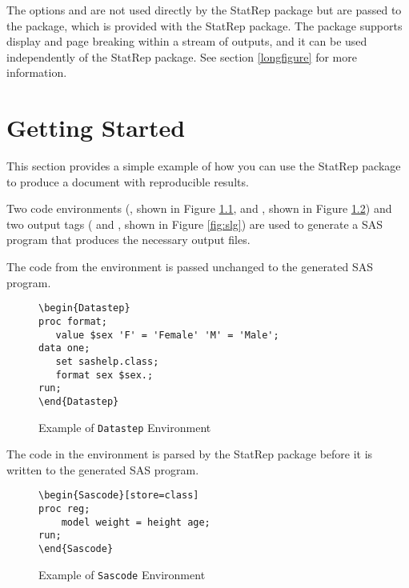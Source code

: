 \documentclass[article,oneside]{memoir}
\newcommand*{\StatRep}{\textsf{StatRep}\xspace}
\begin{document}
     The options  and  are not used directly by the \StatRep
     package but are passed to the  package, which
     is provided with the \StatRep package.
    The  package
    supports display and page breaking within a stream of outputs, and it can be
    used independently of the \StatRep package. See section \ref{longfigure} for
more information.

\chapter{Getting Started}\label{gs}

This section provides a simple example of how you can use the \StatRep package
to produce a document with reproducible results.

  Two code environments
  (, shown in Figure \ref{fig:d1}, and
  , shown in Figure \ref{fig:s1})
  and two output tags
  ( and , shown in Figure \ref{fig:slg})
  are used to generate a SAS program that produces
  the necessary output files.

  The code from the  environment is passed unchanged to the
  generated SAS program.
\begin{figure}[H]
\begin{snugshade}
\begin{verbatim}
\begin{Datastep}
proc format;
   value $sex 'F' = 'Female' 'M' = 'Male';
data one;
   set sashelp.class;
   format sex $sex.;
run;
\end{Datastep}
\end{verbatim}
\end{snugshade}
\caption{Example of \texttt{Datastep} Environment}\label{fig:d1}
\end{figure}

  The code in the  environment is parsed by the \StatRep package before it is
  written to the generated SAS program.

\begin{figure}[H]
\begin{snugshade}
\begin{verbatim}
\begin{Sascode}[store=class]
proc reg;
    model weight = height age;
run;
\end{Sascode}
\end{verbatim}
\end{snugshade}
\caption{Example of \texttt{Sascode} Environment}\label{fig:s1}
\end{figure}
\end{document}
